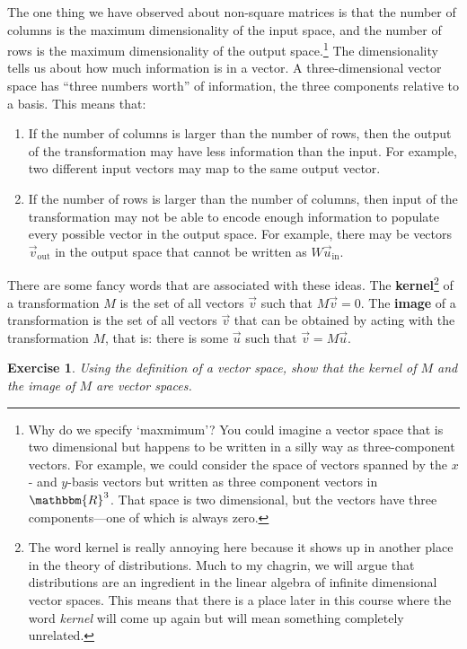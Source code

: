 \documentclass[12pt]{article}
\newtheorem{exercise}{Exercise}[section]
\begin{document}
The one thing we have observed about non-square matrices is that the number of columns is the maximum dimensionality of the input space, and the number of rows is the maximum dimensionality of the output space.\footnote{Why do we specify `maxmimum'? You could imagine a vector space that is two dimensional but happens to be written in a silly way as three-component vectors. For example, we could consider the space of vectors spanned by the $x$- and $y$-basis vectors but written as three component vectors in $\mathbbm{R}^3$. That space is two dimensional, but the vectors have three components---one of which is always zero.} The dimensionality tells us about how much information is in a vector. A three-dimensional vector space has ``three numbers worth'' of information, the three components relative to a basis. This means that:
\begin{enumerate}
    \item If the number of columns is larger than the number of rows, then the output of the transformation may have less information than the input. For example, two different input vectors may map to the same output vector.
    \item If the number of rows is larger than the number of columns, then input of the transformation may not be able to encode enough information to populate every possible vector in the output space. For example, there may be vectors $\vec{v}_\text{out}$ in the output space that cannot be written as $W\vec{u}_\text{in}$. 
\end{enumerate}
There are some fancy words that are associated with these ideas. The \textbf{kernel}\footnote{The word kernel is really annoying here because it shows up in another place in the theory of distributions. Much to my chagrin, we will argue that distributions are an ingredient in the linear algebra of infinite dimensional vector spaces. This means that there is a place later in this course where the word \emph{kernel} will come up again but will mean something completely unrelated.} of a transformation $M$ is the set of all vectors $\vec{v}$ such that $M\vec{v} = 0$. The \textbf{image} of a transformation is the set of all vectors $\vec{v}$ that can be obtained by acting with the transformation $M$, that is: there is some $\vec{u}$ such that $\vec{v} = M\vec{u}$.
\begin{exercise}
Using the definition of a vector space, show that the kernel of $M$ and the image of $M$ are vector spaces. 
\end{exercise}
\end{document}
